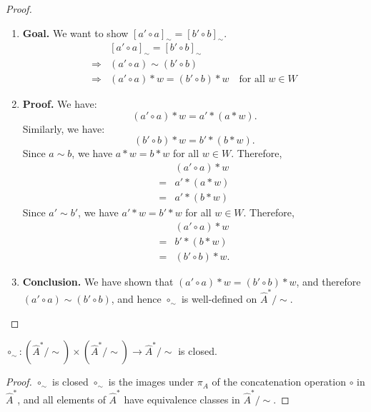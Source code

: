 \begin{proof}
\begin{enumerate}[(1)]
    \item \textbf{Goal.}
          We want to show $[a' \circ a]_{\sim} = [b' \circ b]_{\sim}$.
          \begin{align}
                            & [a' \circ a]_{\sim} = [b' \circ b]_{\sim}                               \\
              \Rightarrow{} & (a' \circ a) \sim (b' \circ b)                                          \\
              \Rightarrow{} & (a' \circ a) \ast w = (b' \circ b) \ast w \quad \text{for all } w \in W
          \end{align}

    \item \textbf{Proof.}
          We have:
          \begin{equation}
              (a' \circ a) \ast w = a' \ast (a \ast w).
          \end{equation}
          Similarly, we have:
          \begin{equation}
              (b' \circ b) \ast w = b' \ast (b \ast w).
          \end{equation}
          Since $a \sim b$, we have $a \ast w = b \ast w$ for all $w \in W$.
          Therefore,
          \begin{align}
                  & (a' \circ a) \ast w \\
              ={} & a' \ast (a \ast w)  \\
              ={} & a' \ast (b \ast w)
          \end{align}
          Since $a' \sim b'$, we have $a' \ast w = b' \ast w$ for all $w \in W$.
          Therefore,
          \begin{align}
                  & (a' \circ a) \ast w  \\
              ={} & b' \ast (b \ast w)   \\
              ={} & (b' \circ b) \ast w.
          \end{align}


    \item \textbf{Conclusion.}
          We have shown that $(a' \circ a) \ast w = (b' \circ b) \ast w$, and therefore $(a' \circ a) \sim (b' \circ b)$, and hence $\circ_{\sim}$ is well-defined on $\hat{A}^{\ast}/\sim$.
\end{enumerate}
\end{proof}

\begin{proposition}\label{prp:circ_sim_closed}
	$\circ_{\sim}: (\hat{A}^{\ast}/\sim) \times (\hat{A}^{\ast}/\sim) \to \hat{A}^{\ast}/\sim$ is closed.
\end{proposition}
\begin{proof}
	$\circ_{\sim}$ is closed $\circ_{\sim}$ is the images under $\pi_{A}$ of the concatenation operation $\circ$ in $\hat{A}^{\ast}$, and all elements of $\hat{A}^{\ast}$ have equivalence classes in $\hat{A}^{\ast}/\sim$.
\end{proof}


